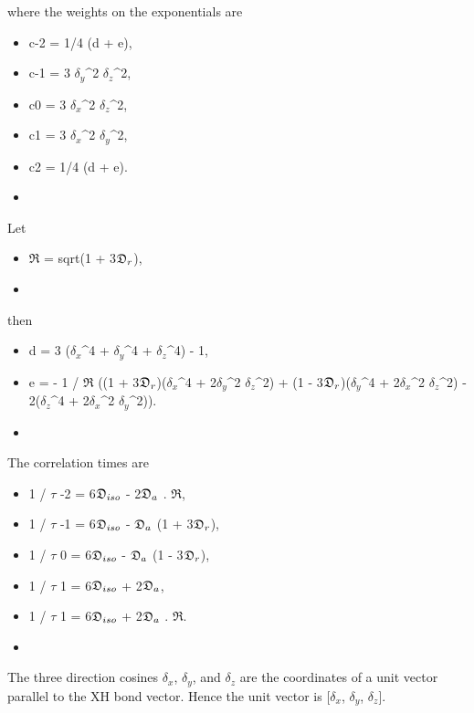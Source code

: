  where the weights on the exponentials are 
  

 \begin{itemize} 
 \item[] c-2 = 1/4 (d + e),  
 \item[] c-1 = 3 $\delta_y$\^{}2 $\delta_z$\^{}2,  
 \item[] c0  = 3 $\delta_x$\^{}2 $\delta_z$\^{}2,  
 \item[] c1  = 3 $\delta_x$\^{}2 $\delta_y$\^{}2,  
 \item[] c2  = 1/4 (d + e).  
 \item[]  
 \end{itemize} 
  

 Let 
  

 \begin{itemize} 
 \item[] $\mathfrak{R}$ = sqrt(1 + 3$\mathfrak{D}_r$),  
 \item[]  
 \end{itemize} 
  

 then 
  

 \begin{itemize} 
 \item[] d = 3 ($\delta_x$\^{}4 + $\delta_y$\^{}4 + $\delta_z$\^{}4) - 1,  
 \item[] e = - 1 / $\mathfrak{R}$ ((1 + 3$\mathfrak{D}_r$)($\delta_x$\^{}4 + 2$\delta_y$\^{}2 $\delta_z$\^{}2) + (1 - 3$\mathfrak{D}_r$)($\delta_y$\^{}4 + 2$\delta_x$\^{}2 $\delta_z$\^{}2) - 2($\delta_z$\^{}4 + 2$\delta_x$\^{}2 $\delta_y$\^{}2)).  
 \item[]  
 \end{itemize} 
  

 The correlation times are 
  

 \begin{itemize} 
 \item[] 1 / $\tau$ -2 = 6$\mathfrak{D}_{iso}$ - 2$\mathfrak{D}_a$ . $\mathfrak{R}$,  
 \item[] 1 / $\tau$ -1 = 6$\mathfrak{D}_{iso}$ - $\mathfrak{D}_a$ (1 + 3$\mathfrak{D}_r$),  
 \item[] 1 / $\tau$ 0  = 6$\mathfrak{D}_{iso}$ - $\mathfrak{D}_a$ (1 - 3$\mathfrak{D}_r$),  
 \item[] 1 / $\tau$ 1  = 6$\mathfrak{D}_{iso}$ + 2$\mathfrak{D}_a$,  
 \item[] 1 / $\tau$ 1  = 6$\mathfrak{D}_{iso}$ + 2$\mathfrak{D}_a$ . $\mathfrak{R}$.  
 \item[]  
 \end{itemize} 
  

 The three direction cosines $\delta_x$, $\delta_y$, and $\delta_z$ are the coordinates of a unit vector parallel to the XH bond vector.  Hence the unit vector is [$\delta_x$, $\delta_y$, $\delta_z$]. 
  

